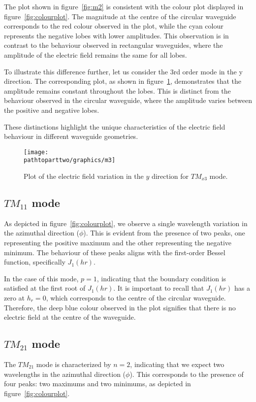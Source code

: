 The plot shown in figure~\ref{fig:m2} is consistent with the colour plot displayed in figure~\ref{fig:colourplot}. The magnitude at the centre of the circular waveguide corresponds to the red colour observed in the plot, while the cyan colour represents the negative lobes with lower amplitudes. This observation is in contrast to the behaviour observed in rectangular waveguides, where the amplitude of the electric field remains the same for all lobes.

To illustrate this difference further, let us consider the 3rd order mode in the y direction. The corresponding plot, as shown in figure~\ref{fig:m3}, demonstrates that the amplitude remains constant throughout the lobes. This is distinct from the behaviour observed in the circular waveguide, where the amplitude varies between the positive and negative lobes.

These distinctions highlight the unique characteristics of the electric field behaviour in different waveguide geometries.
\begin{figure}[h]
\centering
\texttt{[image: \\pathtoparttwo/graphics/m3]}
\caption{Plot of the electric field variation in the $y$ direction for $TM_{x3}$ mode.}
\label{fig:m3}
\end{figure}

\subsection{$TM_{11}$ mode}
As depicted in figure~\ref{fig:colourplot}, we observe a single wavelength variation in the azimuthal direction ($\phi$). This is evident from the presence of two peaks, one representing the positive maximum and the other representing the negative minimum. The behaviour of these peaks aligns with the first-order Bessel function, specifically $J_1(hr)$.

In the case of this mode, $p=1$, indicating that the boundary condition is satisfied at the first root of $J_1(hr)$. It is important to recall that $J_1(hr)$ has a zero at $h_r=0$, which corresponds to the centre of the circular waveguide. Therefore, the deep blue colour observed in the plot signifies that there is no electric field at the centre of the waveguide.

\subsection{$TM_{21}$ mode}
The $TM_{21}$ mode is characterized by $n=2$, indicating that we expect two wavelengths in the azimuthal direction ($\phi$). This corresponds to the presence of four peaks: two maximums and two minimums, as depicted in figure~\ref{fig:colourplot}.

